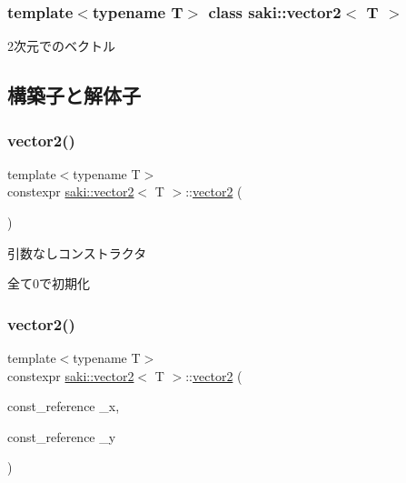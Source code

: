 \subsubsection*{template$<$typename T$>$\newline
class saki\+::vector2$<$ T $>$}

2次元でのベクトル 

\subsection{構築子と解体子}
\mbox{\label{classsaki_1_1vector2_a30a12a2e1e15cf3a41d33e7f3829aade}} 
\subsubsection{\texorpdfstring{vector2()}{vector2()}\hspace{0.1cm}{\footnotesize\ttfamily [1/5]}}
{\footnotesize\ttfamily template$<$typename T$>$ \\
constexpr \mbox{\hyperlink{classsaki_1_1vector2}{saki\+::vector2}}$<$ T $>$\+::\mbox{\hyperlink{classsaki_1_1vector2}{vector2}} (\begin{DoxyParamCaption}{ }\end{DoxyParamCaption})\hspace{0.3cm}{\ttfamily [inline]}}



引数なしコンストラクタ 

全て0で初期化 \mbox{\label{classsaki_1_1vector2_a28a39f7c69d7fd6393d498065cc51c00}} 
\subsubsection{\texorpdfstring{vector2()}{vector2()}\hspace{0.1cm}{\footnotesize\ttfamily [2/5]}}
{\footnotesize\ttfamily template$<$typename T$>$ \\
constexpr \mbox{\hyperlink{classsaki_1_1vector2}{saki\+::vector2}}$<$ T $>$\+::\mbox{\hyperlink{classsaki_1_1vector2}{vector2}} (\begin{DoxyParamCaption}\item[{const\+\_\+reference}]{\+\_\+x,  }\item[{const\+\_\+reference}]{\+\_\+y }\end{DoxyParamCaption})\hspace{0.3cm}{\ttfamily [inline]}}



